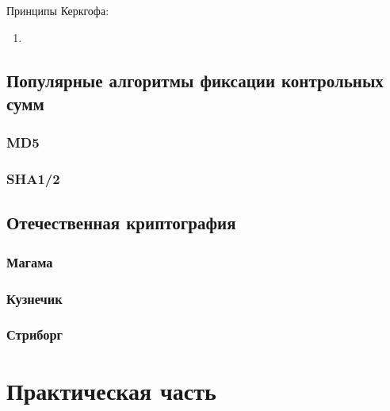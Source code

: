 \documentclass[oneside,final,14pt]{extreport}
\begin{document}
	\large{Принципы Керкгофа:}
	\begin{enumerate}
		\item 
	\end{enumerate}





	\section{Популярные алгоритмы фиксации контрольных сумм}

		\subsection{MD5}

		\subsection{SHA1/2}

	\section{Отечественная криптография}

		\subsection{Магама}

		\subsection{Кузнечик}

		\subsection{Стриборг}

\chapter{Практическая часть}
\end{document}
